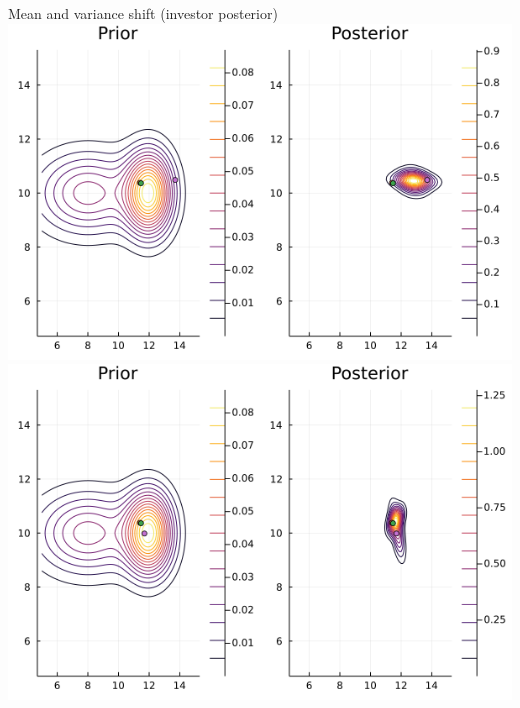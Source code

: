 \documentclass[
  ignorenonframetext,
]{beamer}
\begin{document}
\begin{frame}{Mean and variance shift (investor posterior)}
\protect\hypertarget{mean-and-variance-shift-investor-posterior}{}
\includegraphics[width=0.4\paperwidth]{complexity_files/figure-beamer/unnamed-chunk-14-1}
\includegraphics[width=0.4\paperwidth]{complexity_files/figure-beamer/unnamed-chunk-14-2}
\end{frame}
\end{document}
